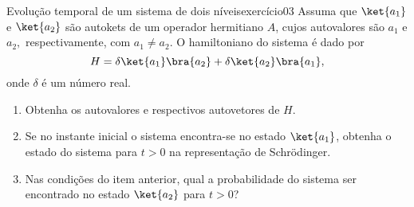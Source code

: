 \begin{exercício}{Evolução temporal de um sistema de dois níveis}{exercício03}
    Assuma que \(\ket{a_1}\) e \(\ket{a_2}\) são autokets de um operador hermitiano \(A\), cujos autovalores são \(a_1\) e \(a_2,\) respectivamente, com \(a_1 \neq a_2\). O hamiltoniano do sistema é dado por
    \begin{equation*}
         H = \delta \ket{a_1}\bra{a_2} + \delta \ket{a_2}\bra{a_1},
    \end{equation*}
    onde \(\delta\) é um número real.
    \begin{enumerate}[label=(\alph*)]
        \item Obtenha os autovalores e respectivos autovetores de \(H\).
        \item Se no instante inicial o sistema encontra-se no estado \(\ket{a_1}\), obtenha o estado do sistema para \(t > 0\) na representação de Schrödinger.
        \item Nas condições do item anterior, qual a probabilidade do sistema ser encontrado no estado \(\ket{a_2}\) para \(t > 0\)?
    \end{enumerate}
\end{exercício}
